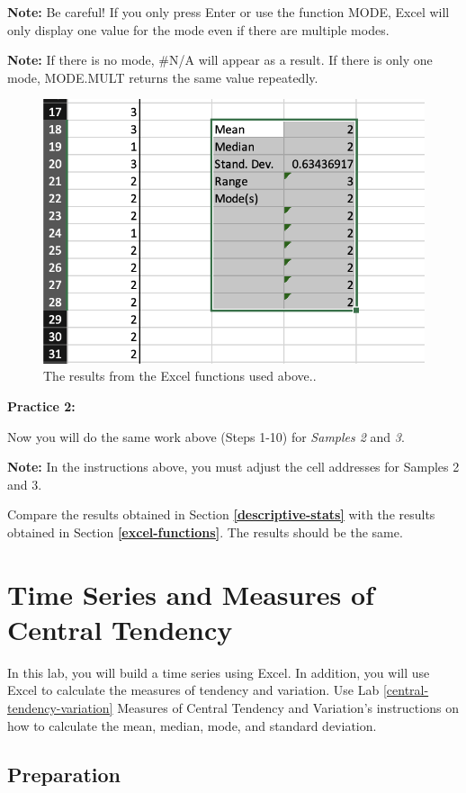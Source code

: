 \documentclass[
]{book}
\begin{document}
\textbf{Note:} Be careful! If you only press Enter or use the function MODE, Excel will only display one value for the mode even if there are multiple modes.

\textbf{Note:} If there is no mode, \#N/A will appear as a result. If there is only one mode, MODE.MULT returns the same value repeatedly.

\begin{figure}

{\centering \includegraphics[width=0.4\linewidth]{excel-functions} 

}

\caption{The results from the Excel functions used above..}\label{fig:excel-functions}
\end{figure}

\textbf{Practice 2:}

Now you will do the same work above (Steps 1-10) for \emph{Samples 2} and \emph{3}.

\textbf{Note:} In the instructions above, you must adjust the cell addresses for Samples 2 and 3.

Compare the results obtained in Section \textbf{\ref{descriptive-stats}} with the results obtained in Section \textbf{\ref{excel-functions}}. The results should be the same.

\hypertarget{time-series}{%
\chapter{Time Series and Measures of Central Tendency}\label{time-series}}

In this lab, you will build a time series using Excel. In addition, you will use Excel to calculate the measures of tendency and variation. Use Lab \ref{central-tendency-variation} Measures of Central Tendency and Variation's instructions on how to calculate the mean, median, mode, and standard deviation.

\hypertarget{preparation-2}{%
\section{Preparation}\label{preparation-2}}
\end{document}
